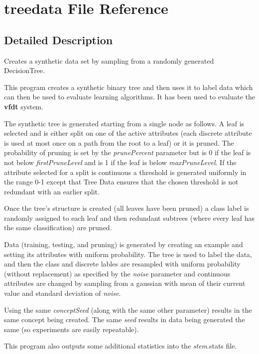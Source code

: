 \section{treedata File Reference}
\label{treedata}


\subsection{Detailed Description}
Creates a synthetic data set by sampling from a randomly generated Decision\-Tree. 

This program creates a synthetic binary tree and then uses it to label data which can then be used to evaluate learning algorithms. It has been used to evaluate the {\bf vfdt} system.

The synthetic tree is generated starting from a single node as follows. A leaf is selected and is either split on one of the active attributes (each discrete attribute is used at most once on a path from the root to a leaf) or it is pruned. The probability of pruning is set by the {\em prune\-Percent\/} parameter but is 0 if the leaf is not below {\em first\-Prune\-Level\/} and is 1 if the leaf is below {\em max\-Prune\-Level\/}. If the attribute selected for a split is continuous a threshold is generated uniformly in the range 0-1 except that Tree Data ensures that the chosen threshold is not redundant with an earlier split.

Once the tree's structure is created (all leaves have been pruned) a class label is randomly assigned to each leaf and then redundant subtrees (where every leaf has the same classification) are pruned.

Data (training, testing, and pruning) is generated by creating an example and setting its attributes with uniform probability. The tree is used to label the data, and then the class and discrete lables are resampled with uniform probability (without replacement) as specified by the {\em noise\/} parameter and continuous attributes are changed by sampling from a gaussian with mean of their current value and standard deviation of {\em noise\/}.

Using the same {\em concept\-Seed\/} (along with the same other parameter) results in the same concept being created. The same {\em seed\/} results in data being generated the same (so experiments are easily repeatable).

This program also outputs some additional statistics into the {\em stem\/}.stats file.

